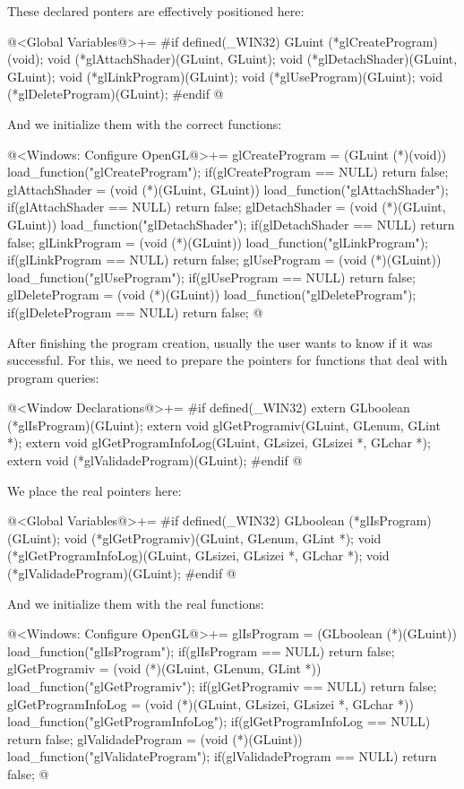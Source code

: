 These declared ponters are effectively positioned here:

\iniciocodigo
@<Global Variables@>+=
#if defined(_WIN32)
GLuint (*glCreateProgram)(void);
void (*glAttachShader)(GLuint, GLuint);
void (*glDetachShader)(GLuint, GLuint);
void (*glLinkProgram)(GLuint);
void (*glUseProgram)(GLuint);
void (*glDeleteProgram)(GLuint);
#endif
@
\fimcodigo

And we initialize them with the correct functions:

\iniciocodigo
@<Windows: Configure OpenGL@>+=
glCreateProgram = (GLuint (*)(void)) load_function("glCreateProgram");
if(glCreateProgram == NULL) return false;
glAttachShader = (void (*)(GLuint, GLuint)) load_function("glAttachShader");
if(glAttachShader == NULL) return false;
glDetachShader = (void (*)(GLuint, GLuint)) load_function("glDetachShader");
if(glDetachShader == NULL) return false;
glLinkProgram = (void (*)(GLuint)) load_function("glLinkProgram");
if(glLinkProgram == NULL) return false;
glUseProgram = (void (*)(GLuint)) load_function("glUseProgram");
if(glUseProgram == NULL) return false;
glDeleteProgram = (void (*)(GLuint)) load_function("glDeleteProgram");
if(glDeleteProgram == NULL) return false;
@
\fimcodigo

After finishing the program creation, usually the user wants to know
if it was successful.  For this, we need to prepare the pointers for
functions that deal with program queries:

\iniciocodigo
@<Window Declarations@>+=
#if defined(_WIN32)
extern GLboolean (*glIsProgram)(GLuint);
extern void glGetProgramiv(GLuint, GLenum, GLint *);
extern void glGetProgramInfoLog(GLuint, GLsizei, GLsizei *, GLchar *);
extern void (*glValidadeProgram)(GLuint);
#endif
@
\fimcodigo

We place the real pointers here:

\iniciocodigo
@<Global Variables@>+=
#if defined(_WIN32)
GLboolean (*glIsProgram)(GLuint);
void (*glGetProgramiv)(GLuint, GLenum, GLint *);
void (*glGetProgramInfoLog)(GLuint, GLsizei, GLsizei *, GLchar *);
void (*glValidadeProgram)(GLuint);
#endif
@
\fimcodigo

And we initialize them with the real functions:

\iniciocodigo
@<Windows: Configure OpenGL@>+=
glIsProgram = (GLboolean (*)(GLuint)) load_function("glIsProgram");
if(glIsProgram == NULL) return false;
glGetProgramiv = (void (*)(GLuint, GLenum, GLint *))
                    load_function("glGetProgramiv");
if(glGetProgramiv == NULL) return false;
glGetProgramInfoLog = (void (*)(GLuint, GLsizei, GLsizei *, GLchar *))
                          load_function("glGetProgramInfoLog");
if(glGetProgramInfoLog == NULL) return false;
glValidadeProgram = (void (*)(GLuint)) load_function("glValidateProgram");
if(glValidadeProgram == NULL) return false;
@
\fimcodigo


